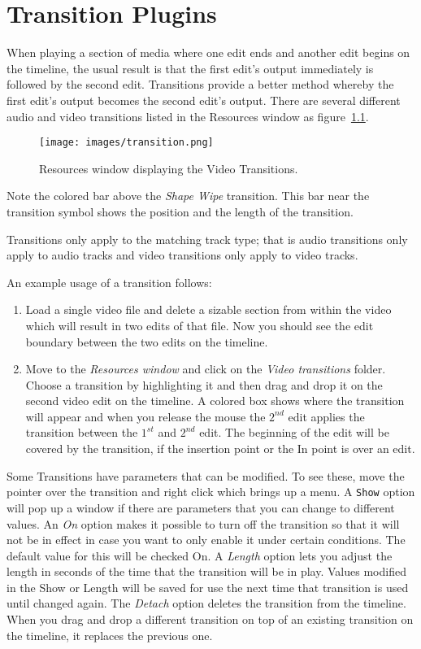 \chapter{Transition Plugins}%
\label{cha:transition_plugin}

When playing a section of media where one edit ends and another edit begins on the timeline,
the usual result is that the first edit's output immediately is followed by the second edit.  Transitions provide a better method whereby the first edit’s output becomes the second edit’s output.  There are several different audio and video transitions listed in the Resources window as figure~\ref{fig:transition}.

\begin{figure}[htpb]
    \centering
    \texttt{[image: images/transition.png]}
    \caption{Resources window displaying the Video Transitions.}
    \label{fig:transition}
\end{figure}

Note the colored bar above the \textit{Shape Wipe} transition.
This bar near the transition symbol shows the position and the length of the transition.

Transitions only apply to the matching track type; that is audio transitions only apply to audio tracks
and video transitions only apply to video tracks.

An example usage of a transition follows:
\begin{enumerate}
    \item Load a single video file and delete a sizable section from within the video which will result in two edits of that file. Now you should see the edit boundary between the two edits on the timeline.
    \item Move to the \textit{Resources window} and click on the \textit{Video transitions} folder. Choose a transition by highlighting it and then drag and drop it on the second video edit on the timeline. A colored box shows where the transition will appear and when you release the mouse the $2^{nd}$ edit applies the transition between the $1^{st}$ and $2^{nd}$ edit.
The beginning of the edit will be covered by the transition, if the insertion point or the In point is over an edit.
\end{enumerate}
Some Transitions have parameters that can be modified. To see these, move the pointer over the transition and right click which brings up a menu. A \texttt{Show} option will pop up a window if there are parameters that you can change to different values. 
An \textit{On} option makes it possible to turn off the transition so that it will not be in effect in case you want to only enable it under certain conditions.  The default value for this will be checked On.
A \textit{Length} option lets you adjust the length in seconds of the time that the transition will be in play.  Values modified in the Show or Length will be saved for use the next time that transition is used until changed again. 
The \textit{Detach} option deletes the transition from the timeline. When you drag and drop a different transition on top of an existing transition on the timeline, it replaces the previous one.

